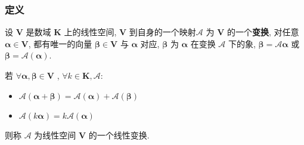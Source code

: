 \documentclass{article}
\begin{document}
			\subsubsection{定义}
				设 $\boldsymbol V$ 是数域 $\mathbf K$ 上的线性空间, $\boldsymbol V$ 到自身的一个映射$\mathscr{A}$ 为 $\boldsymbol V$ 的一个\textbf{变换}, 对任意 $\boldsymbol \alpha \in \boldsymbol V$, 都有唯一的向量 $\boldsymbol \beta \in \boldsymbol V$ 与 $\boldsymbol \alpha$ 对应, $\boldsymbol{\beta}$ 为 $\boldsymbol{\alpha}$ 在变换 $\mathscr{A}$ 下的象, $\boldsymbol{\beta}=\mathscr{A} \boldsymbol{\alpha}$ 或 $\boldsymbol{\beta}=\mathscr{A}(\boldsymbol{\alpha})$.

				若 $\forall\boldsymbol{\alpha}, \boldsymbol{\beta} \in \boldsymbol V$ , $\forall k \in \mathbf K, \mathscr{A}$:
				\begin{itemize} \item $\mathscr{A}(\boldsymbol{\alpha}+\boldsymbol{\beta})=\mathscr{A}(\boldsymbol{\alpha})+\mathscr{A}(\boldsymbol{\beta})$
				\item $\mathscr{A}(k \boldsymbol{\alpha})=k \mathscr{A}(\boldsymbol{\alpha})$
				\end{itemize}
				则称 $\mathscr{A}$ 为线性空间 $\boldsymbol V$ 的一个线性变换.
\end{document}
